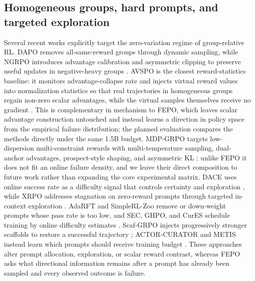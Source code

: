 \documentclass{article}
\newcommand{\FEPO}{\textsc{FEPO}\xspace}
\begin{document}
\subsection{Homogeneous groups, hard prompts, and targeted exploration}
Several recent works explicitly target the zero-variation regime of group-relative RL. DAPO removes all-same-reward groups through dynamic sampling, while NGRPO introduces advantage calibration and asymmetric clipping to preserve useful updates in negative-heavy groups \citep{nan2025ngrpo}. AVSPO is the closest reward-statistics baseline: it monitors advantage-collapse rate and injects virtual reward values into normalization statistics so that real trajectories in homogeneous groups regain non-zero scalar advantages, while the virtual samples themselves receive no gradient \citep{he2026avspo}. This is complementary in mechanism to \FEPO, which leaves scalar advantage construction untouched and instead learns a direction in policy space from the empirical failure distribution; the planned evaluation compares the methods directly under the same 1.5B budget. MDP-GRPO targets low-dispersion multi-constraint rewards with multi-temperature sampling, dual-anchor advantages, prospect-style shaping, and asymmetric KL \citep{salmani2026mdpgrpo}; unlike \FEPO it does not fit an online failure density, and we leave their direct composition to future work rather than expanding the core experimental matrix. DACE uses online success rate as a difficulty signal that controls certainty and exploration \citep{li2025dace}, while XRPO addresses stagnation on zero-reward prompts through targeted in-context exploration \citep{bamba2025xrpo}. AdaRFT and SimpleRL-Zoo remove or down-weight prompts whose pass rate is too low, and SEC, GHPO, and CurES schedule training by online difficulty estimates \citep{shi2025adarrt,zeng2025simplerlzoo,chen2025sec,liu2025ghpo,cur2025cures}. Scaf-GRPO injects progressively stronger scaffolds to restore a successful trajectory \citep{zhang2025scaf}; ACTOR-CURATOR and METIS instead learn which prompts should receive training budget \citep{gu2026actorcurator,zheng2026metis}. These approaches alter prompt allocation, exploration, or scalar reward contrast, whereas \FEPO asks what directional information remains after a prompt has already been sampled and every observed outcome is failure.
\end{document}
